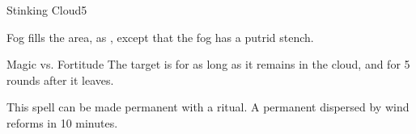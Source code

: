 \begin{spellsection}{Stinking Cloud}{5}
\begin{spellheader}
\end{spellheader}
\begin{spellcontent}
    \begin{spelltargetinginfo}
    \end{spelltargetinginfo}
    \begin{spelleffects}
        \spelleffect Fog fills the area, as , except that the fog has a putrid stench.
        \spelldur \durshort
    \end{spelleffects}
\end{spellcontent}
\begin{spellsubcontent}
    \begin{spelltargetinginfo}
    \end{spelltargetinginfo}
    \begin{spelleffects}
        \begin{spellattack}{Magic vs. Fortitude}
            \spellsuccess The target is \sickened for as long as it remains in the cloud, and for 5 rounds after it leaves.
        \end{spellattack}
    \end{spelleffects}
\end{spellsubcontent}
\begin{spellfooter}
    \spellnotes This spell can be made permanent with a  ritual. A permanent  dispersed by wind reforms in 10 minutes. \fogspellnotes \fogwindspellnotes

    \physicalspellnotes
\end{spellfooter}
\end{spellsection}

